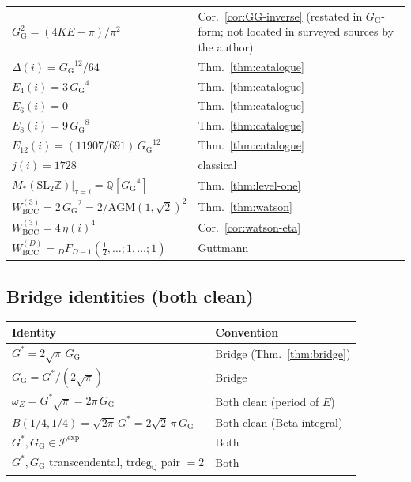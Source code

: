 \documentclass[11pt]{article}
\theoremstyle{definition}
\theoremstyle{remark}
\newcommand{\Gs}{G^{*}}
\newcommand{\GG}{G_{\!\scriptscriptstyle\mathrm{G}}}
\newcommand{\Z}{\mathbb{Z}}
\newcommand{\Q}{\mathbb{Q}}
\newcommand{\AGM}{\mathrm{AGM}}
\begin{document}
\begin{center}
\begin{tabular}{p{}p{}}
$\GG^2 = (4 K E - \pi)/\pi^2$ & Cor.~\ref{cor:GG-inverse} (restated in $\GG$-form; not located in surveyed sources by the author) \\
$\Delta(i) = {\GG}^{12}/64$ & Thm.~\ref{thm:catalogue} \\
$E_4(i) = 3\,{\GG}^4$ & Thm.~\ref{thm:catalogue} \\
$E_6(i) = 0$ & Thm.~\ref{thm:catalogue} \\
$E_8(i) = 9\,{\GG}^8$ & Thm.~\ref{thm:catalogue} \\
$E_{12}(i) = (11907/691)\,{\GG}^{12}$ & Thm.~\ref{thm:catalogue} \\
$j(i) = 1728$ & classical \\
$M_*(\mathrm{SL}_2\Z)|_{\tau=i} = \Q[{\GG}^4]$ & Thm.~\ref{thm:level-one} \\
$W^{(3)}_{\mathrm{BCC}} = 2\,{\GG}^2 = 2/\AGM(1,\sqrt 2)^2$ & Thm.~\ref{thm:watson} \\
$W^{(3)}_{\mathrm{BCC}} = 4\,\eta(i)^4$ & Cor.~\ref{cor:watson-eta} \\
$W^{(D)}_{\mathrm{BCC}} = {}_DF_{D-1}(\tfrac12,\ldots;1,\ldots;1)$ & Guttmann \cite{guttmann2010} \\
\bottomrule
\end{tabular}
\end{center}

\subsection{Bridge identities (both clean)}

\begin{center}
\begin{tabular}{p{}p{}}
\toprule
Identity & Convention \\
\midrule
$\Gs = 2\sqrt\pi\,\GG$ & Bridge (Thm.~\ref{thm:bridge}) \\
$\GG = \Gs/(2\sqrt\pi)$ & Bridge \\
$\omega_E = \Gs\sqrt\pi = 2\pi\,\GG$ & Both clean (period of $E$) \\
$B(1/4, 1/4) = \sqrt{2\pi}\,\Gs = 2\sqrt 2\,\pi\,\GG$ & Both clean (Beta integral) \\
$\Gs, \GG \in \mathcal{P}^{\exp}$ & Both \\
$\Gs, \GG$ transcendental, $\mathrm{trdeg}_{\Q}$ pair $= 2$ & Both \\
\bottomrule
\end{tabular}
\end{center}
\end{document}
